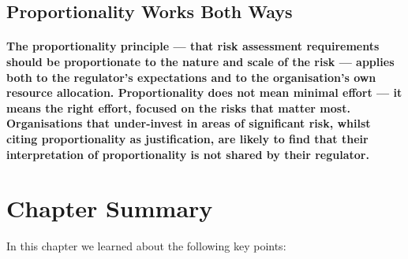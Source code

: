 \subsection{Proportionality Works Both Ways}
\paragraph{The proportionality principle — that risk assessment requirements should be proportionate to the nature and scale of the risk — applies both to the regulator's expectations and to the organisation's own resource allocation. Proportionality does not mean minimal effort — it means the right effort, focused on the risks that matter most. Organisations that under-invest in areas of significant risk, whilst citing proportionality as justification, are likely to find that their interpretation of proportionality is not shared by their regulator.}

\newpage
\section{Chapter Summary}
In this chapter we learned about the following key points:

